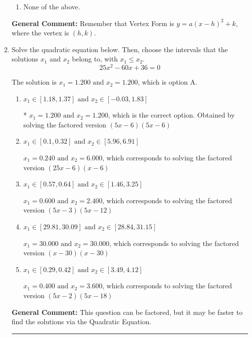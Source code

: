 \documentclass{extbook}[14pt]
\newcommand{\litem}[1]{\item #1

\rule{\textwidth}{0.4pt}}
\begin{document}
\begin{enumerate}
{\begin{enumerate}[label=\Alph*.]
\item None of the above.\end{enumerate}
\textbf{General Comment:} Remember that Vertex Form is $y = a(x-h)^2+k$, where the vertex is $(h, k)$.
}
\litem{
Solve the quadratic equation below. Then, choose the intervals that the solutions $x_1$ and $x_2$ belong to, with $x_1 \leq x_2$.
\[ 25x^{2} -60 x + 36 = 0 \]

The solution is \( x_1 = 1.200 \text{ and } x_2 = 1.200 \), which is option A.\begin{enumerate}[label=\Alph*.]
\item \( x_1 \in [1.18, 1.37] \text{ and } x_2 \in [-0.03, 1.83] \)

* $x_1 = 1.200 \text{ and } x_2 = 1.200$, which is the correct option. Obtained by solving the factored version $(5x -6)(5x -6)$
\item \( x_1 \in [0.1, 0.32] \text{ and } x_2 \in [5.96, 6.91] \)

$x_1 = 0.240 \text{ and } x_2 = 6.000$, which corresponds to solving the factored version $(25x -6)(x -6)$
\item \( x_1 \in [0.57, 0.64] \text{ and } x_2 \in [1.46, 3.25] \)

$x_1 = 0.600 \text{ and } x_2 = 2.400$, which corresponds to solving the factored version $(5x -3)(5x -12)$
\item \( x_1 \in [29.81, 30.09] \text{ and } x_2 \in [28.84, 31.15] \)

$x_1 = 30.000 \text{ and } x_2 = 30.000$, which corresponds to solving the factored version $(x -30)(x -30)$
\item \( x_1 \in [0.29, 0.42] \text{ and } x_2 \in [3.49, 4.12] \)

$x_1 = 0.400 \text{ and } x_2 = 3.600$, which corresponds to solving the factored version $(5x -2)(5x -18)$
\end{enumerate}

\textbf{General Comment:} This question can be factored, but it may be faster to find the solutions via the Quadratic Equation.
}
\end{enumerate}
\end{document}
